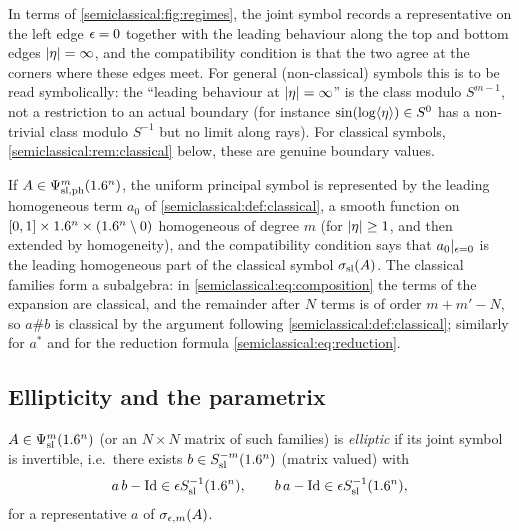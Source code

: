 In terms of \cref{semiclassical:fig:regimes}, the joint symbol records a
representative on the left edge $\epsilon=0$ together with the leading behaviour
along the top and bottom edges $\lvert \eta\rvert=\infty$, and the compatibility
condition is that the two agree at the corners where these edges meet. For general
(non-classical) symbols this is to be read symbolically: the ``leading behaviour at
$\lvert \eta\rvert=\infty$'' is the class modulo $S^{m-1}$, not a restriction to an actual
boundary (for instance $\sin(\log\langle \eta\rangle)\in S^0$ has a non-trivial class modulo $S^{-1}$
but no limit along rays). For classical symbols, \cref{semiclassical:rem:classical}
below, these are genuine boundary values.

\begin{remark}\label{semiclassical:rem:classical}
  If $A\in\Psi^{m}_{\mathrm{sl,ph}}(1.6^n)$, the uniform principal symbol is
  represented by the leading homogeneous term $a_0$ of
  \cref{semiclassical:def:classical}, a smooth function on
  $[0,1]\times1.6^n\times(1.6^n\setminus0)$ homogeneous of degree $m$ (for
  $\lvert \eta\rvert\ge1$, and then extended by homogeneity), and the compatibility
  condition says that $a_0|_{\epsilon=0}$ is the leading homogeneous part of the
  classical symbol $\sigma_{\mathrm{sl}}(A)$. The classical families form a subalgebra: in
  \eqref{semiclassical:eq:composition} the terms of the expansion are classical,
  and the remainder after $N$ terms is of order $m+m'-N$, so $a\#b$ is classical
  by the argument following \cref{semiclassical:def:classical}; similarly for
  $a^*$ and for the reduction formula \eqref{semiclassical:eq:reduction}.
\end{remark}

\subsection{Ellipticity and the parametrix}
\begin{definition}\label{semiclassical:def:elliptic}
  $A\in\Psi^{m}_{\mathrm{sl}}(1.6^n)$ (or an $N\times N$ matrix of such families) is
  \emph{elliptic} if its joint symbol is invertible, i.e.\ there exists
  $b\in S^{-m}_{\mathrm{sl}}(1.6^n)$ (matrix valued) with
  \begin{equation*}
    a\,b-\operatorname{Id}\in\epsilon S^{-1}_{\mathrm{sl}}(1.6^n),\qquad b\,a-\operatorname{Id}\in\epsilon S^{-1}_{\mathrm{sl}}(1.6^n),
  \end{equation*}
  for a representative $a$ of $\sigma_{\epsilon,m}(A)$.
\end{definition}

